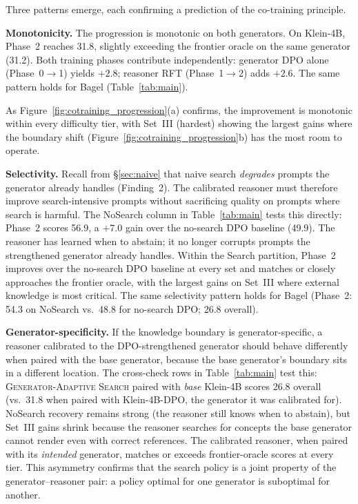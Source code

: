 \documentclass{article}
\newcommand{\CondGAS}{\textsc{Generator-Adaptive Search}}
\begin{document}
Three patterns emerge, each confirming a prediction of the co-training principle.

\textbf{Monotonicity.}
The progression is monotonic on both generators. On Klein-4B, Phase~2 reaches 31.8, slightly exceeding the frontier oracle on the same generator (31.2). Both training phases contribute independently: generator DPO alone (Phase~0$\to$1) yields $+2.8$; reasoner RFT (Phase~1$\to$2) adds $+2.6$. The same pattern holds for Bagel (Table~\ref{tab:main}).

As Figure~\ref{fig:cotraining_progression}(a) confirms, the improvement is monotonic within every difficulty tier, with Set~III (hardest) showing the largest gains where the boundary shift (Figure~\ref{fig:cotraining_progression}b) has the most room to operate.

\textbf{Selectivity.}
Recall from \S\ref{sec:naive} that naive search \emph{degrades} prompts the generator already handles (Finding~2).
The calibrated reasoner must therefore improve search-intensive prompts without sacrificing quality on prompts where search is harmful.
The NoSearch column in Table~\ref{tab:main} tests this directly: Phase~2 scores 56.9, a $+$7.0 gain over the no-search DPO baseline (49.9).
The reasoner has learned when to abstain; it no longer corrupts prompts the strengthened generator already handles.
Within the Search partition, Phase~2 improves over the no-search DPO baseline at every set and matches or closely approaches the frontier oracle, with the largest gains on Set~III where external knowledge is most critical.
The same selectivity pattern holds for Bagel (Phase~2: 54.3 on NoSearch vs.\ 48.8 for no-search DPO; 26.8 overall).

\textbf{Generator-specificity.}
If the knowledge boundary is generator-specific, a reasoner calibrated to the DPO-strengthened generator should behave differently when paired with the base generator, because the base generator's boundary sits in a different location.
The cross-check rows in Table~\ref{tab:main} test this: \CondGAS{} paired with \emph{base} Klein-4B scores 26.8 overall (vs.\ 31.8 when paired with Klein-4B-DPO, the generator it was calibrated for).
NoSearch recovery remains strong (the reasoner still knows when to abstain), but Set~III gains shrink because the reasoner searches for concepts the base generator cannot render even with correct references.
The calibrated reasoner, when paired with its \emph{intended} generator, matches or exceeds frontier-oracle scores at every tier.
This asymmetry confirms that the search policy is a joint property of the generator--reasoner pair: a policy optimal for one generator is suboptimal for another.
\end{document}
